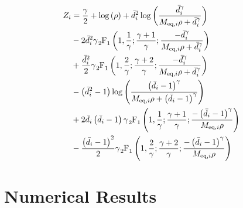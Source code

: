 \begin{equation} \label{eq:zi_chapter}
\begin{aligned}
    Z_i &= \frac{\gamma}{2} + \log\left(\rho\right) + \bar{d}_i^2\log\left(
    \frac{\bar{d}_i^{\gamma}}{\Meqi \rho + \bar{d}_i^{\gamma}}\right)\\
    &- 2 \bar{d}_i^2\gamma \hgeo \left(1,\frac{1}{\gamma};
    \frac{\gamma+1}{\gamma};\frac{-\bar{d}_i^{\gamma}}{\Meqi\rho +
    \bar{d}_i^{\gamma}}\right)\\
    &+ \frac{\bar{d}_i^2}{2}\gamma \hgeo\left(1, \frac{2}{\gamma};
    \frac{\gamma+2}{\gamma};\frac{-\bar{d}_i^{\gamma}}{\Meqi\rho +
    \bar{d}_i^{\gamma}}\right)\\
    &- \left(\bar{d}_i^2-1\right)\log\left(
    \frac{\left(\bar{d}_i-1\right)^{\gamma}}
    {\Meqi\rho+\left(\bar{d}_i - 1\right)^{\gamma}}\right)\\
    &+ 2\bar{d}_i\left(\bar{d}_i - 1\right)\gamma\hgeo\left(1,\frac{1}{\gamma};
    \frac{\gamma + 1}{\gamma};\frac{-\left(\bar{d}_i-1\right)^{\gamma}}
    {\Meqi\rho}\right)\\
    &- \frac{\left(\bar{d}_i-1\right)^2}{2}\gamma\hgeo\left(1,\frac{2}{\gamma};
    \frac{\gamma + 2}{\gamma};\frac{-\left(\bar{d}_i-1\right)^{\gamma}}
    {\Meqi\rho}\right)
\end{aligned}
\end{equation}

\section{Numerical Results}\label{sec:achiev_numerical}

